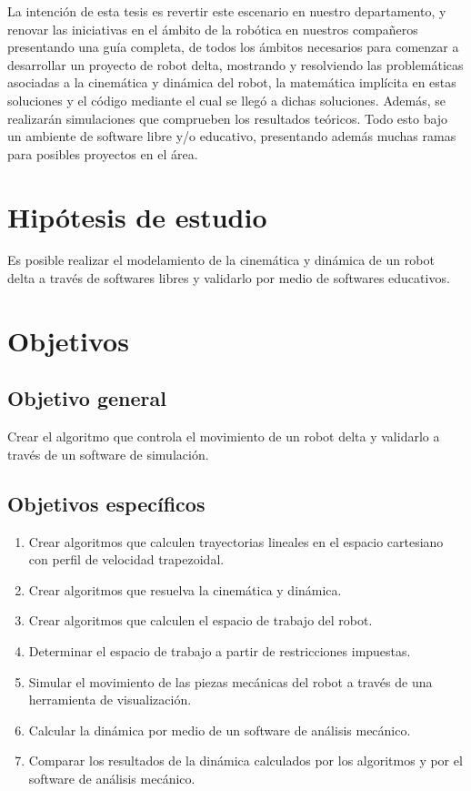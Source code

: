 La intención de esta tesis es revertir este escenario en nuestro departamento, y renovar las iniciativas en el ámbito de la robótica en nuestros compañeros presentando una guía completa, de todos los ámbitos necesarios para comenzar a desarrollar un proyecto de robot delta, mostrando y resolviendo las problemáticas asociadas a la cinemática y dinámica del robot, la matemática implícita en estas soluciones y el código mediante el cual se llegó a dichas soluciones. Además, se realizarán simulaciones que comprueben los resultados teóricos. Todo esto bajo un ambiente de software libre y/o educativo, presentando además muchas ramas para posibles proyectos en el área.

\section{Hipótesis de estudio}
Es posible realizar el modelamiento de la cinemática y dinámica de un robot delta a través de softwares libres y validarlo por medio de softwares educativos.

\section{Objetivos}

    \subsection{Objetivo general}
        Crear el algoritmo que controla el movimiento de un robot delta y validarlo a través de un software de simulación.
\subsection{Objetivos específicos}
\begin{enumerate}
    \item {Crear algoritmos que calculen trayectorias lineales en el espacio cartesiano con perfil de velocidad trapezoidal.}
    \item {Crear algoritmos que resuelva la cinemática y dinámica.}
    \item {Crear algoritmos que calculen el espacio de trabajo del robot.}
    \item {Determinar el espacio de trabajo a partir de restricciones impuestas.}
    \item {Simular el movimiento de las piezas mecánicas del robot a través de una herramienta de visualización.}
    \item {Calcular la dinámica por medio de un software de análisis mecánico.}
    \item {Comparar los resultados de la dinámica calculados por los algoritmos y por el software de análisis mecánico. }
\end{enumerate}

